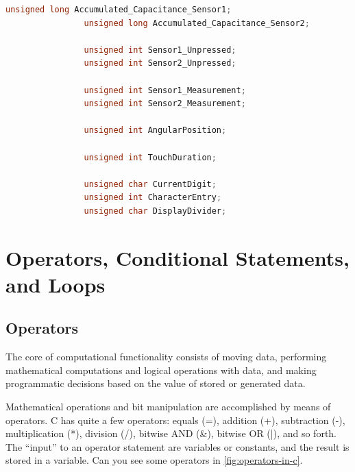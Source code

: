                  
            \begin{lstlisting}[style=mystyle_c, language=c, breaklines]
                unsigned long Accumulated_Capacitance_Sensor1;
                unsigned long Accumulated_Capacitance_Sensor2;
                    
                unsigned int Sensor1_Unpressed;
                unsigned int Sensor2_Unpressed;
                    
                unsigned int Sensor1_Measurement;
                unsigned int Sensor2_Measurement;
                    
                unsigned int AngularPosition;
                    
                unsigned int TouchDuration;
                    
                unsigned char CurrentDigit;
                unsigned int CharacterEntry;
                unsigned char DisplayDivider;
            \end{lstlisting}
                

    \section{Operators, Conditional Statements, and Loops} \label{sec:section_cl.4} 
        \subsection{Operators}
        
            The core of computational functionality consists of moving data, performing mathematical computations and logical operations with data, and making programmatic decisions based on the value of stored or generated data.
                
            Mathematical operations and bit manipulation are accomplished by means of operators. C has quite a few operators: equals (=), addition (+), subtraction (-), multiplication (*), division (/), bitwise AND (\&), bitwise OR (|), and so forth. The ``input'' to an operator statement are variables or constants, and the result is stored in a variable. Can you see some operators in \autoref{fig:operators-in-c}.
    
